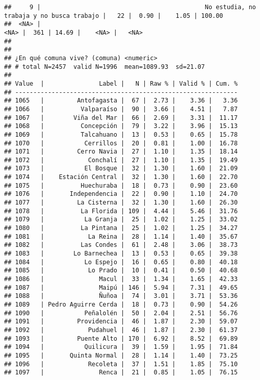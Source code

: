 \documentclass[
  10,
  landscape,
  legalpaper]{article}
\begin{document}
\begin{verbatim}
##     9 |                                             No estudia, no trabaja y no busca trabajo |   22 |  0.90 |    1.05 | 100.00
##  <NA> |                                                                                  <NA> |  361 | 14.69 |    <NA> |   <NA>
## 
## 
## ¿En qué comuna vive? (comuna) <numeric>
## # total N=2457  valid N=1996  mean=1089.93  sd=21.07
## 
## Value  |               Label |   N | Raw % | Valid % | Cum. %
## -------------------------------------------------------------
## 1065   |         Antofagasta |  67 |  2.73 |    3.36 |   3.36
## 1066   |          Valparaíso |  90 |  3.66 |    4.51 |   7.87
## 1067   |        Viña del Mar |  66 |  2.69 |    3.31 |  11.17
## 1068   |          Concepción |  79 |  3.22 |    3.96 |  15.13
## 1069   |          Talcahuano |  13 |  0.53 |    0.65 |  15.78
## 1070   |           Cerrillos |  20 |  0.81 |    1.00 |  16.78
## 1071   |         Cerro Navia |  27 |  1.10 |    1.35 |  18.14
## 1072   |            Conchalí |  27 |  1.10 |    1.35 |  19.49
## 1073   |           El Bosque |  32 |  1.30 |    1.60 |  21.09
## 1074   |    Estación Central |  32 |  1.30 |    1.60 |  22.70
## 1075   |          Huechuraba |  18 |  0.73 |    0.90 |  23.60
## 1076   |       Independencia |  22 |  0.90 |    1.10 |  24.70
## 1077   |         La Cisterna |  32 |  1.30 |    1.60 |  26.30
## 1078   |          La Florida | 109 |  4.44 |    5.46 |  31.76
## 1079   |           La Granja |  25 |  1.02 |    1.25 |  33.02
## 1080   |          La Pintana |  25 |  1.02 |    1.25 |  34.27
## 1081   |            La Reina |  28 |  1.14 |    1.40 |  35.67
## 1082   |          Las Condes |  61 |  2.48 |    3.06 |  38.73
## 1083   |        Lo Barnechea |  13 |  0.53 |    0.65 |  39.38
## 1084   |           Lo Espejo |  16 |  0.65 |    0.80 |  40.18
## 1085   |            Lo Prado |  10 |  0.41 |    0.50 |  40.68
## 1086   |               Macul |  33 |  1.34 |    1.65 |  42.33
## 1087   |               Maipú | 146 |  5.94 |    7.31 |  49.65
## 1088   |               Ñuñoa |  74 |  3.01 |    3.71 |  53.36
## 1089   | Pedro Aguirre Cerda |  18 |  0.73 |    0.90 |  54.26
## 1090   |           Peñalolén |  50 |  2.04 |    2.51 |  56.76
## 1091   |         Providencia |  46 |  1.87 |    2.30 |  59.07
## 1092   |            Pudahuel |  46 |  1.87 |    2.30 |  61.37
## 1093   |         Puente Alto | 170 |  6.92 |    8.52 |  69.89
## 1094   |           Quilicura |  39 |  1.59 |    1.95 |  71.84
## 1095   |       Quinta Normal |  28 |  1.14 |    1.40 |  73.25
## 1096   |            Recoleta |  37 |  1.51 |    1.85 |  75.10
## 1097   |               Renca |  21 |  0.85 |    1.05 |  76.15

\end{verbatim}
\end{document}
